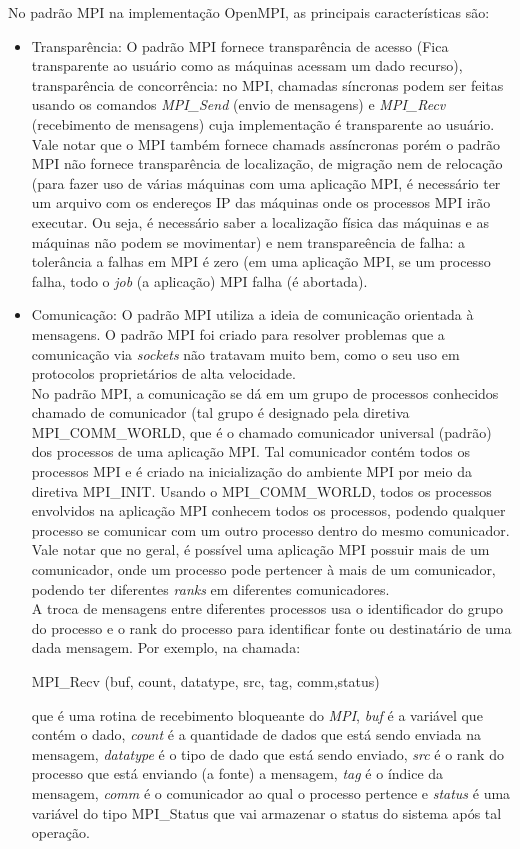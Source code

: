 \documentclass[a4paper,10pt]{article}
\begin{document}
No padrão MPI na implementação OpenMPI, as principais características são:
\begin{itemize}
\item{Transparência}: O padrão MPI fornece transparência de acesso (Fica transparente ao usuário como as máquinas acessam um dado recurso), transparência de concorrência: no MPI, chamadas síncronas podem ser feitas usando os comandos \emph{MPI\_Send} (envio de mensagens) e \emph{MPI\_Recv} (recebimento de mensagens) cuja implementação é transparente ao usuário. Vale notar que o MPI também fornece chamads assíncronas porém o padrão MPI não fornece transparência de localização, de migração  nem de relocação  (para fazer uso de várias máquinas com uma aplicação MPI, é necessário ter um arquivo com os endereços IP das máquinas onde os processos MPI irão executar. Ou seja, é necessário saber a localização física das máquinas e as máquinas não podem se movimentar) e nem transpareência de falha: a tolerância a falhas em MPI é zero (em uma aplicação MPI, se um processo falha, todo o \emph{job} (a aplicação) MPI falha (é abortada).

\item{Comunicação}: O padrão MPI utiliza a ideia de comunicação orientada à mensagens. O padrão MPI foi criado para resolver problemas que a comunicação via \emph{sockets} não tratavam muito bem, como o seu uso em protocolos proprietários de alta velocidade.\\
No padrão MPI, a comunicação se dá em um grupo de processos conhecidos chamado de comunicador (tal grupo é designado pela diretiva MPI\_COMM\_WORLD, que é o chamado comunicador universal (padrão) dos processos de uma aplicação MPI. Tal comunicador contém todos os processos MPI e é criado na inicialização do ambiente MPI por meio da diretiva MPI\_INIT. Usando o MPI\_COMM\_WORLD, todos os processos envolvidos na aplicação MPI conhecem todos os processos, podendo qualquer processo se comunicar com um outro processo dentro do mesmo comunicador. Vale notar que no geral, é possível uma aplicação MPI possuir mais de um comunicador, onde um processo pode pertencer à mais de um comunicador, podendo ter diferentes \emph{ranks} em diferentes comunicadores.\\

A troca de mensagens entre diferentes processos usa o identificador do grupo do processo e o rank do processo para identificar fonte ou destinatário de uma dada mensagem. Por exemplo, na chamada:\\
\begin{center} MPI\_Recv (buf, count, datatype, src, tag, comm,status)\\ \end{center}
que é uma rotina de recebimento bloqueante do \emph{MPI}, \emph{buf} é a variável que contém o dado,  \emph{count} é a quantidade de dados que está sendo enviada na mensagem, \emph{datatype} é o tipo de dado que está sendo enviado, \emph{src} é o rank do processo que está enviando (a fonte) a mensagem, \emph{tag} é o índice da mensagem, \emph{comm} é o comunicador ao qual o processo pertence e \emph{status} é uma variável do tipo MPI\_Status que vai armazenar o status do sistema após tal operação.\\


\end{itemize}
\end{document}
